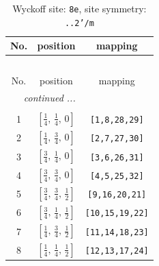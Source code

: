 \documentclass[fleqn,8pt]{jsarticle}
\begin{document}
\renewcommand{\arraystretch}{1.2}
\begin{longtable}{ccc}
\caption{Wyckoff site: {\tt 8e}, site symmetry: {\tt ..2'/m}}
 \\
 \hline \hline
No. & position & mapping \\ \hline \endfirsthead

\multicolumn{2}{l}{\tablename\ \thetable{}} \\
 \hline \hline
No. & position & mapping \\ \hline \endhead

 \hline \hline
\multicolumn{2}{r}{\footnotesize\it continued ...} \\ \endfoot

 \hline \hline
\multicolumn{2}{r}{} \\ \endlastfoot

1 & $\left[ \frac{1}{4},\, \frac{1}{4},\, 0 \right]$ & {\tt [1,8,28,29]} \\ \hline
2 & $\left[ \frac{1}{4},\, \frac{3}{4},\, 0 \right]$ & {\tt [2,7,27,30]} \\ \hline
3 & $\left[ \frac{3}{4},\, \frac{1}{4},\, 0 \right]$ & {\tt [3,6,26,31]} \\ \hline
4 & $\left[ \frac{3}{4},\, \frac{3}{4},\, 0 \right]$ & {\tt [4,5,25,32]} \\ \hline
5 & $\left[ \frac{3}{4},\, \frac{3}{4},\, \frac{1}{2} \right]$ & {\tt [9,16,20,21]} \\ \hline
6 & $\left[ \frac{3}{4},\, \frac{1}{4},\, \frac{1}{2} \right]$ & {\tt [10,15,19,22]} \\ \hline
7 & $\left[ \frac{1}{4},\, \frac{3}{4},\, \frac{1}{2} \right]$ & {\tt [11,14,18,23]} \\ \hline
8 & $\left[ \frac{1}{4},\, \frac{1}{4},\, \frac{1}{2} \right]$ & {\tt [12,13,17,24]} \\
\end{longtable}
\renewcommand{\arraystretch}{1.2}
\end{document}

